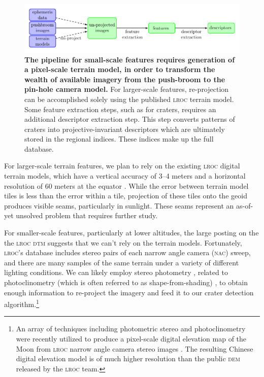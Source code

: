 \documentclass[12pt]{olfmemo}
\begin{document}
\begin{figure}
\includegraphics[width=\textwidth]{pipeline.pdf}
\caption{\label{fig:pipeline}\textbf{The pipeline for small-scale features requires generation of a pixel-scale terrain model, in order to transform the wealth of available imagery from the push-broom to the pin-hole camera model.} For larger-scale features, re-projection can be accomplished solely using the published \textsc{lroc} terrain model. Some feature extraction steps, such as for craters, requires an additional descriptor extraction step. This step converts patterns of craters into projective-invariant descriptors which are ultimately stored in the regional indices. These indices make up the full database.}
\end{figure}

For larger-scale terrain features, we plan to rely on the existing \textsc{lroc} digital terrain models, which have a vertical accuracy of 3--4 meters and a horizontal resolution of 60 meters at the equator \citep{Barker2016}. While the error between terrain model tiles is less than the error within a tile, projection of these tiles onto the geoid produces visible seams, particularly in sunlight. These seams represent an as-of-yet unsolved problem that requires further study.

For smaller-scale features, particularly at lower altitudes, the large posting on the the \textsc{lroc dtm} suggests that we can't rely on the terrain models. Fortunately, \textsc{lroc}'s database includes stereo pairs of each narrow angle camera (\textsc{nac}) sweep, and there are many samples of the same terrain under a variety of different lighting conditions. We can likely employ stereo photometry \citep{Woodham1980}, related to photoclinometry (which is often referred to as shape-from-shading) \citep{Horn1977,Kirk1987}, to obtain enough information to re-project the imagery and feed it to our crater detection algorithm.\footnote{An array of techniques including photometric stereo and photoclinometry were recently utilized to produce a pixel-scale digital elevation map of the Moon from \textsc{lroc} narrow angle camera stereo images \citep{Liu2020}. The resulting Chinese digital elevation model is of much higher resolution than the public \textsc{dem} released by the \textsc{lroc} team.}
\end{document}
